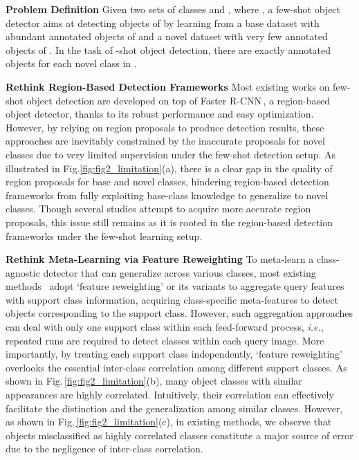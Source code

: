 \documentclass[letterpaper]{article} \usepackage{aaai22}  \usepackage{times}  \usepackage{helvet}  \usepackage{courier}  \usepackage[hyphens]{url}  \usepackage{graphicx} \urlstyle{rm} \def\UrlFont{\rm}  \usepackage{natbib}  \usepackage{caption} \DeclareCaptionStyle{ruled}{labelfont=normalfont,labelsep=colon,strut=off} \frenchspacing  \setlength{\pdfpagewidth}{8.5in}  \setlength{\pdfpageheight}{11in}  \usepackage{algorithm}
\begin{document}
\noindent\textbf{Problem Definition\;\;}
Given two sets of classes  and , where , a few-shot object detector aims at detecting objects of  by learning from a base dataset  with abundant annotated objects of  and a novel dataset  with very few annotated objects of . In the task of -shot object detection, there are exactly  annotated objects for each novel class in .

\vspace{+0.5mm}
\smallskip
\noindent\textbf{Rethink Region-Based Detection Frameworks\;\;}
Most existing works on few-shot object detection are developed on top of Faster R-CNN\,\cite{FasterRCNN}, a region-based object detector, thanks to its robust performance and easy optimization. However, by relying on region proposals to produce detection results, these approaches are inevitably constrained by the inaccurate proposals for novel classes due to very limited supervision under the few-shot detection setup. As illustrated in Fig.\;\ref{fig:fig2_limitation}(a), there is a clear gap in the quality of region proposals for base and novel classes, hindering region-based detection frameworks from fully exploiting base-class knowledge to generalize to novel classes. Though several studies\;\cite{fsod,CoRPN} attempt to acquire more accurate region proposals, this issue still remains as it is rooted in the region-based detection frameworks under the few-shot learning setup.

\smallskip
\vspace{+0.5mm}
\noindent\textbf{Rethink Meta-Learning via Feature Reweighting\;\;}
To meta-learn a class-agnostic detector that can generalize across various classes, most existing methods~\citep{FewshotReweighting,metarcnn,fsod,FSDetView} adopt `feature reweighting' or its variants to aggregate query features with support class information, acquiring class-specific meta-features to detect objects corresponding to the support class. However, such aggregation approaches can deal with only one support class within each feed-forward process, \textit{i.e.},  repeated runs are required to detect  classes within each query image. More importantly, by treating each support class independently, `feature reweighting' overlooks the essential inter-class correlation among different support classes. As shown in Fig.\,\ref{fig:fig2_limitation}(b), many object classes with similar appearances are highly correlated. Intuitively, their correlation can effectively facilitate the distinction and the generalization among similar classes. However, as shown in Fig.\,\ref{fig:fig2_limitation}(c), in existing methods, we observe that objects misclassified as highly correlated classes constitute a major source of error due to the negligence of inter-class correlation.
\end{document}
